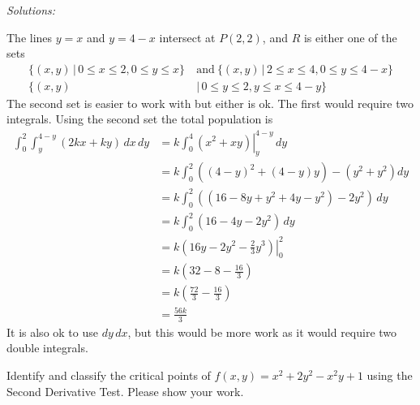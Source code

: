     
    \ifnum {} 
    {\color{DarkBlue} \textit{Solutions:} 
    
    The lines $y=x$ and $y=4-x$ intersect at $P(2,2)$, and $R$ is either one of the sets
    \begin{align}
        \{(x,y) \, | \, 0 \le x \le 2, 0 \le y \le x \} \ 
        &\text{and} \ 
        \{(x,y) \, | \, 2 \le x \le 4, 0 \le y \le 4-x \}\\
        \{(x,y) \, &| \, 0 \le y \le 2, y \le x \le 4-y \} 
    \end{align}
    The second set is easier to work with but either is ok. The first would require two integrals. Using the second set the total population is 
        \begin{align*}
            \int_0^2\int_{y}^{4-y} (2kx+ky) \, dx \, dy 
            &=  k\left. \int_0^4 (x^2+xy) \right|_{y}^{4-y} \, dy \\
            &= k\int_0^2 \left((4-y)^2 + (4-y)y\right) - \left( y^2 +y^2 \right)  dy \\
            &= k\int_0^2 \left((16 - 8y +y^2+4y- y^2) - 2y^2\right)   \, dy \\
            &= k\int_0^2 \left( 16 -4y -2y^2 \right)\, dy \\
            &= k\left. \left( 16y- 2y^2 -\frac23 y^3\right) \right|_0^2  \\
            &= k\left( 32- 8 - \frac{16}{3} \right) \\
            &= k\left( \frac{72}{3}- \frac{16}{3} \right) \\
            &= \frac{56k}{3} 
        \end{align*}   
    It is also ok to use $dy\,dx$, but this would be more work as it would require two double integrals. 
    }
    \else

    \fi
    
\fi





\ifnum {}

    \question[4] Identify and classify the critical points of $f(x,y) = x^2+2y^2-x^2y+1$ using the Second Derivative Test. Please show your work. 

